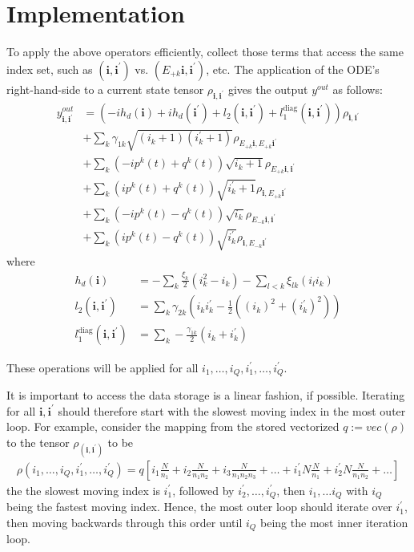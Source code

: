 \documentclass[letterpaper]{article}
\newcommand{\bfi}{\boldsymbol{i}}
\newcommand{\Epk}{E_{+k}}
\newcommand{\Emk}{E_{-k}}
\begin{document}
\section{Implementation}

  To apply the above operators efficiently, collect those terms that access the same index set, such as $(\bfi,\bfi^\prime)$ vs. $(E_{+k}\bfi, \bfi^\prime)$, etc. The application of the ODE's right-hand-side to a current state tensor $\rho_{\bfi,\bfi^\prime}$ gives the output $y^{out}$ as follows:
  \begin{align} 
       y^{out}_{\bfi,\bfi^\prime}  &= 
       \left(-i h_d(\bfi) + ih_d(\bfi^\prime)
        + l_2(\bfi,\bfi^\prime) + l_1^{\text{diag}}(\bfi, \bfi^\prime) \right)
        \rho_{\bfi,\bfi^\prime} \\ \label{eq:applyRHS1}
        &+ \sum_k \gamma_{1k} \sqrt{(i_k+1)(i_k^\prime+1)} \rho_{E_{+k}\bfi,
        E_{+k}\bfi^\prime}\\
        &+ \sum_k \left(-ip^k(t) + q^k(t)\right) \sqrt{i_k+1} \rho_{\Epk \bfi,
        \bfi^\prime} \\
        &+ \sum_k \left( ip^k(t) + q^k(t)\right) \sqrt{i_k^\prime+1}
        \rho_{\bfi,\Epk \bfi^\prime} \\
        &+ \sum_k \left(-ip^k(t) - q^k(t)\right) \sqrt{i_k} \rho_{\Emk \bfi,
        \bfi^\prime} \\
        &+ \sum_k \left( ip^k(t) - q^k(t)\right) \sqrt{i_k^\prime}
        \rho_{\bfi,\Emk \bfi^\prime}  \label{eq:applyRHS2}
  \end{align}
  where 
  \begin{align}
    h_d(\bfi) &= -\sum_k \frac{\xi_k}{2}(i_k^2 - i_k) - \sum_{l<k} \xi_{lk} (i_l
    i_k) \\
    l_2(\bfi,\bfi^\prime) &= \sum_k \gamma_{2k} \left(i_ki_k^\prime - \frac 12
    \left( (i_k)^2 + (i_k^\prime)^2\right) \right)\\
    l_1^{\text{diag}}(\bfi, \bfi^\prime) &= \sum_k
    -\frac{\gamma_{1k}}{2}\left(i_k + i_k^\prime\right) 
  \end{align}

  These operations will be applied for all $i_1,\dots, i_Q, i_1^\prime, \dots,
  i_Q^\prime$. 
  
  It is important to access the data storage is a linear fashion, if possible.
  Iterating for all $\bfi, \bfi^\prime$ should therefore start with the slowest
  moving index in the most outer loop. For example, consider the mapping from
  the stored vectorized $q := vec(\rho)$ to the tensor $\rho_(\bfi,\bfi^\prime)$
  to be
    \begin{align}
        \rho(i_1,\dots,i_Q,i_1^\prime,\dots,i_Q^\prime) = q[i_1 \frac{N}{n_1} +
        i_2\frac{N}{n_1n_2} + i_3\frac{N}{n_1n_2n_3} + \dots + i_1^\prime
        N\frac{N}{n_1} + i_2^\prime N\frac{N}{n_1n_2} + \dots]
    \end{align}
  the the slowest moving index is $i_1^\prime$, followed by $i_2^\prime, \dots,
  i_Q^\prime$, then $i_1, \dots i_Q$ with $i_Q$ being the fastest moving index.
  Hence, the most outer loop should iterate over $i_1^\prime$, then moving
  backwards through this order until $i_Q$ being the most inner iteration loop.
\end{document}
